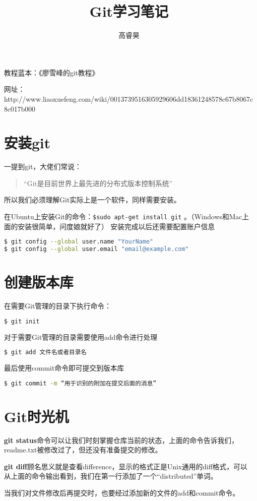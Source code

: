 \documentclass[UTF8]{ctexart}
\author{高睿昊}
\title{\zihao{0}\heiti Git学习笔记}
\newenvironment{myquote}
  {\begin{quote}\kaishu\zihao{-5}}
  {\end{quote}}
\begin{document}
\maketitle
{\center 教程蓝本：《廖雪峰的git教程》

网址：http://www.liaoxuefeng.com/wiki/0013739516305929606dd18361248578c67b8067c8c017b000}
\section{安装git}
一提到git，大佬们常说：
\begin{myquote}
\kaishu “Git是目前世界上最先进的分布式版本控制系统”
\end{myquote}
所以我们必须理解Git实际上是一个软件，同样需要安装。

在Ubuntu上安装Git的命令：\lstinline!$sudo apt-get install git! 。（Windows和Mac上面的安装很简单，问度娘就好了）
安装完成以后还需要配置账户信息
\begin{lstlisting}[language=bash]
$ git config --global user.name "YourName"
$ git config --global user.email "email@example.com"
\end{lstlisting}

\section{创建版本库}
在需要Git管理的目录下执行命令：
\begin{lstlisting}[language=bash]
$ git init
\end{lstlisting}
对于需要Git管理的目录需要使用add命令进行处理
\begin{lstlisting}[language=bash]
$ git add 文件名或者目录名
\end{lstlisting}
最后使用commit命令即可提交到版本库
\begin{lstlisting}[language=bash]
$ git commit -m “用于识别的附加在提交后面的消息”
\end{lstlisting}

\section{Git时光机}
\textbf{git status}命令可以让我们时刻掌握仓库当前的状态，上面的命令告诉我们，readme.txt被修改过了，但还没有准备提交的修改。

\textbf{git diff}顾名思义就是查看difference，显示的格式正是Unix通用的diff格式，可以从上面的命令输出看到，我们在第一行添加了一个“distributed”单词。

当我们对文件修改后再提交时，也要经过添加新的文件的add和commit命令。
\end{document}
